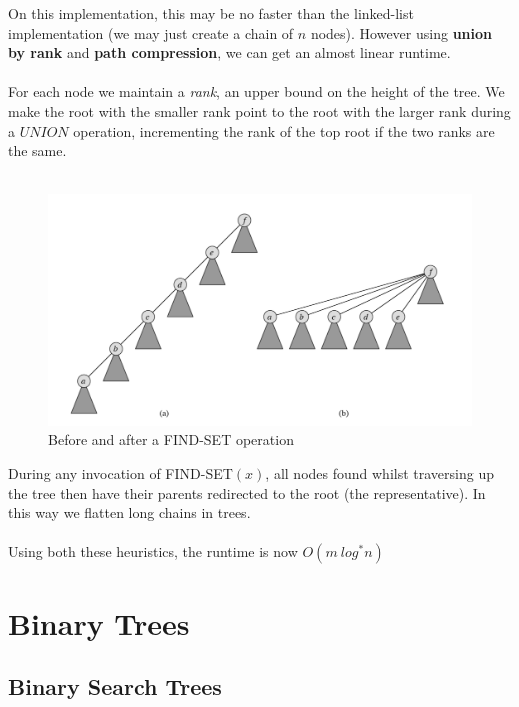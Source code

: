 \documentclass{article}
\theoremstyle{plain}
\theoremstyle{definition}
\begin{document}
        On this implementation, this may be no faster than the linked-list implementation (we may just create a chain of $n$ nodes). However using \textbf{union by rank} and \textbf{path compression}, we can get an almost linear runtime. \\ \\
        
        For each node we maintain a \textit{rank}, an upper bound on the height of the tree. We make the root with the smaller rank point to the root with the larger rank during a $UNION$ operation, incrementing the rank of the top root if the two ranks are the same. \\ \\
        

        \begin{figure}[H]
            \centering
            \includegraphics[width=\linewidth]{images/pathcompression.png}
            \caption{Before and after a FIND-SET operation}
            \label{fig:pathcompression}
        \end{figure}
        
        During any invocation of FIND-SET$(x)$, all nodes found whilst traversing up the tree then have their parents redirected to the root (the representative). In this way we flatten long chains in trees. \\ \\
        Using both these heuristics, the runtime is now $O(m \ log^* n)$

\section{Binary Trees}

    \subsection{Binary Search Trees}
\end{document}
